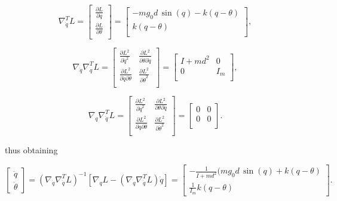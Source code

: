 \documentclass[a4paper]{article}
\begin{document}
\begin{equation}
    \nonumber
    \nabla_{\dot{q}}^{T} L = 
    \begin{bmatrix}
        \frac{\partial L}{\partial q} \\[3mm]
        \frac{\partial L}{\partial \theta} \\
    \end{bmatrix} =
    \begin{bmatrix}
        -mg_0d\,\sin(q) - k(q-\theta) \\
        k(q-\theta)\\
    \end{bmatrix},
\end{equation}

\begin{equation}
    \nonumber
    \nabla_{\dot{q}} \nabla_{\dot{q}}^{T} L =
    \begin{bmatrix}
        \frac{\partial L^2}{\partial \dot{q}^2} & \frac{\partial L^2}{\partial \dot{\theta} \partial \dot{q}} \\
        \frac{\partial L^2}{\partial \dot{q} \partial \dot{\theta}} & \frac{\partial L^2}{\partial \dot{\theta}^2} \\
    \end{bmatrix} =
    \begin{bmatrix}
        I+md^2 & 0 \\
        0 & I_m \\
    \end{bmatrix},
\end{equation}

\begin{equation}
    \nonumber
    \nabla_{q} \nabla_{\dot{q}}^{T} L =
    \begin{bmatrix}
        \frac{\partial L^2}{\partial \dot{q}^2} & \frac{\partial L^2}{\partial \theta \partial \dot{q}} \\
        \frac{\partial L^2}{\partial q \partial \dot{\theta}} & \frac{\partial L^2}{\partial \dot{\theta}^2} \\
    \end{bmatrix} =
    \begin{bmatrix}
        0 & 0 \\
        0 & 0 \\
    \end{bmatrix}.
\end{equation}


thus obtaining

\begin{equation}
    \label{eq:rig_eul_lag_7}
    \begin{bmatrix}    
        \ddot{q} \\
        \ddot{\theta}
    \end{bmatrix} = (\nabla_{\dot{q}}\nabla_{\dot{q}}^T L)^{-1} [\nabla_{q} L - (\nabla_{q}\nabla_{\dot{q}}^T L)\dot{q}] =
    \begin{bmatrix}
        -\frac{1}{I+md^2} (mg_0d\, \sin(q) + k(q-\theta)\\
        \frac{1}{I_m} k(q-\theta)
    \end{bmatrix}.
\end{equation}
\end{document}
